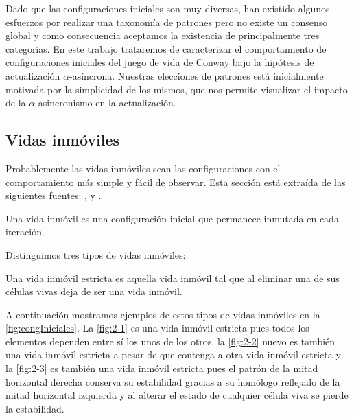 \documentclass[../proyecto.tex]{memoir}
\begin{document}
Dado que las configuraciones iniciales son muy diversas, han existido algunos esfuerzos por realizar una taxonomía de patrones pero no existe un consenso global y como consecuencia aceptamos la existencia de principalmente tres categorías. En este trabajo trataremos de caracterizar el comportamiento de configuraciones iniciales del juego de vida de Conway bajo la hipótesis de actualización $\alpha$-asíncrona. Nuestras elecciones de patrones está inicialmente motivada por la simplicidad de los mismos, que nos permite visualizar el impacto de la $\alpha$-asincronismo en la actualización. %

\subsection{Vidas inmóviles}
Probablemente las vidas inmóviles sean las configuraciones con el comportamiento más simple y fácil de observar. Esta sección está extraída de las siguientes fuentes: \cite{stillLifeProblem},\cite{stillLifeTheory} y \cite{LikeWikiStill}.


\begin{defi}
Una vida inmóvil es una configuración inicial que permanece inmutada en cada iteración.
\end{defi}

Distinguimos tres tipos de vidas inmóviles:

\begin{defi}
Una vida inmóvil estricta es aquella vida inmóvil tal que al eliminar una de sus células vivas deja de ser una vida inmóvil.
\end{defi}

A continuación mostramos ejemplos de estos tipos de vidas inmóviles en la \autoref{fig:congIniciales}. La \autoref{fig:2-1} es una vida inmóvil estricta pues todos los elementos dependen entre sí los unos de los otros, la \autoref{fig:2-2} nuevo es también una vida inmóvil estricta a pesar de que contenga a otra vida inmóvil estricta y la \autoref{fig:2-3} es también una vida inmóvil estricta pues el patrón de la mitad horizontal derecha conserva su estabilidad gracias a su homólogo reflejado de la mitad horizontal izquierda y al alterar el estado de cualquier célula viva se pierde la estabilidad.
\end{document}

